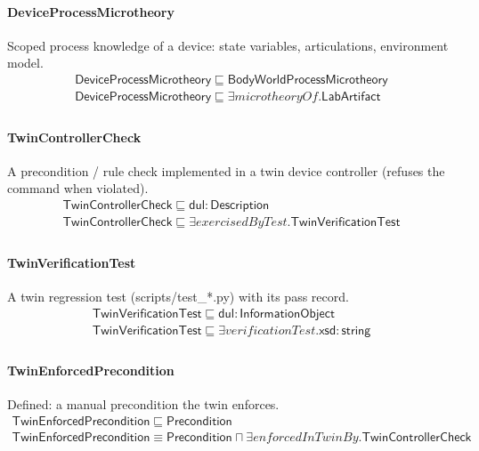 \documentclass[10pt]{article}
\begin{document}
\paragraph{DeviceProcessMicrotheory} Scoped process knowledge of a device: state variables, articulations, environment model.
\[\begin{array}{l}
\mathsf{DeviceProcessMicrotheory} \sqsubseteq  \mathsf{BodyWorldProcessMicrotheory} \\
\mathsf{DeviceProcessMicrotheory} \sqsubseteq  \exists \mathit{microtheoryOf}.\mathsf{LabArtifact} \\
\end{array}\]
\paragraph{TwinControllerCheck} A precondition / rule check implemented in a twin device controller (refuses the command when violated).
\[\begin{array}{l}
\mathsf{TwinControllerCheck} \sqsubseteq  \mathsf{dul{:}Description} \\
\mathsf{TwinControllerCheck} \sqsubseteq  \exists \mathit{exercisedByTest}.\mathsf{TwinVerificationTest} \\
\end{array}\]
\paragraph{TwinVerificationTest} A twin regression test (scripts/test\_*.py) with its pass record.
\[\begin{array}{l}
\mathsf{TwinVerificationTest} \sqsubseteq  \mathsf{dul{:}InformationObject} \\
\mathsf{TwinVerificationTest} \sqsubseteq  \exists \mathit{verificationTest}.\mathsf{xsd{:}string} \\
\end{array}\]
\paragraph{TwinEnforcedPrecondition} Defined: a manual precondition the twin enforces.
\[\begin{array}{l}
\mathsf{TwinEnforcedPrecondition} \sqsubseteq  \mathsf{Precondition} \\
\mathsf{TwinEnforcedPrecondition} \equiv  \mathsf{Precondition} \sqcap  \exists \mathit{enforcedInTwinBy}.\mathsf{TwinControllerCheck} \\
\end{array}\]
\end{document}
